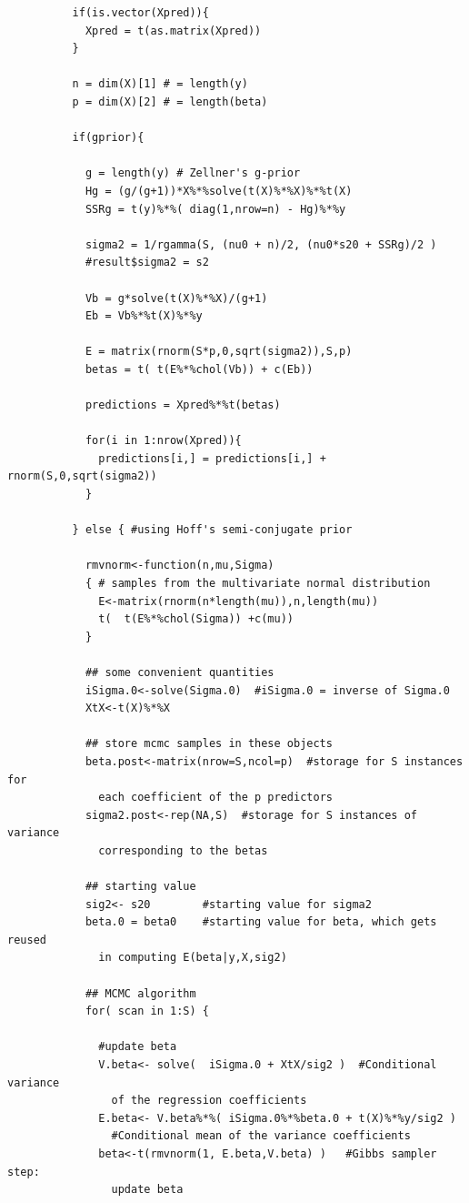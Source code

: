 \documentclass[12pt, a4paper]{article}
\begin{document}
      \begin{verbatim}
          if(is.vector(Xpred)){
            Xpred = t(as.matrix(Xpred))
          }

          n = dim(X)[1] # = length(y)
          p = dim(X)[2] # = length(beta)

          if(gprior){

            g = length(y) # Zellner's g-prior
            Hg = (g/(g+1))*X%*%solve(t(X)%*%X)%*%t(X)
            SSRg = t(y)%*%( diag(1,nrow=n) - Hg)%*%y

            sigma2 = 1/rgamma(S, (nu0 + n)/2, (nu0*s20 + SSRg)/2 )
            #result$sigma2 = s2

            Vb = g*solve(t(X)%*%X)/(g+1)
            Eb = Vb%*%t(X)%*%y

            E = matrix(rnorm(S*p,0,sqrt(sigma2)),S,p)
            betas = t( t(E%*%chol(Vb)) + c(Eb))

            predictions = Xpred%*%t(betas)

            for(i in 1:nrow(Xpred)){
              predictions[i,] = predictions[i,] + rnorm(S,0,sqrt(sigma2))
            }

          } else { #using Hoff's semi-conjugate prior

            rmvnorm<-function(n,mu,Sigma)
            { # samples from the multivariate normal distribution
              E<-matrix(rnorm(n*length(mu)),n,length(mu))
              t(  t(E%*%chol(Sigma)) +c(mu))
            }

            ## some convenient quantities
            iSigma.0<-solve(Sigma.0)  #iSigma.0 = inverse of Sigma.0
            XtX<-t(X)%*%X

            ## store mcmc samples in these objects
            beta.post<-matrix(nrow=S,ncol=p)  #storage for S instances for
              each coefficient of the p predictors
            sigma2.post<-rep(NA,S)  #storage for S instances of variance
              corresponding to the betas

            ## starting value
            sig2<- s20        #starting value for sigma2
            beta.0 = beta0    #starting value for beta, which gets reused
              in computing E(beta|y,X,sig2)

            ## MCMC algorithm
            for( scan in 1:S) {

              #update beta
              V.beta<- solve(  iSigma.0 + XtX/sig2 )  #Conditional variance
                of the regression coefficients
              E.beta<- V.beta%*%( iSigma.0%*%beta.0 + t(X)%*%y/sig2 )
                #Conditional mean of the variance coefficients
              beta<-t(rmvnorm(1, E.beta,V.beta) )   #Gibbs sampler step:
                update beta


\end{verbatim}
\end{document}
